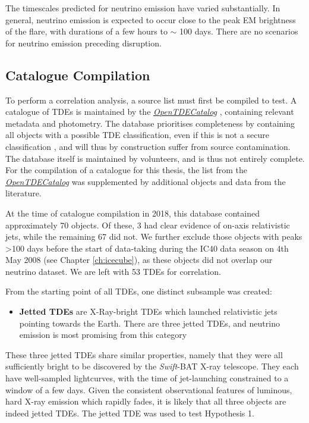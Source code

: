 The timescales predicted for neutrino emission have varied substantially. In general, neutrino emission is expected to occur close to the peak EM brightness of the flare, with durations of a few hours to $\sim$ 100 days. There are no scenarios for neutrino emission preceding disruption. 

\subsection{Catalogue Compilation}

To perform a correlation analysis, a source list must first be compiled to test. A catalogue of TDEs is maintained by the \emph{\href{https://tde.space/}{OpenTDECatalog}} , containing relevant metadata and photometry. The database prioritises completeness by containing all objects with a possible TDE classification, even if this is not a secure classification \cite{tde_catalog_paper}, and will thus by construction suffer from source contamination. The database itself is maintained by volunteers, and is thus not entirely complete. For the compilation of a catalogue for this thesis, the list from the \emph{\href{https://tde.space/}{OpenTDECatalog}} was supplemented by additional objects and data from the literature.

At the time of catalogue compilation in 2018, this database contained approximately 70 objects. Of these, 3 had clear evidence of on-axis relativistic jets, while the remaining 67 did not. We further exclude those objects with peaks >100 days before the start of data-taking during the IC40 data season on 4th May 2008 (see Chapter \ref{ch:icecube}), as these objects did not overlap our neutrino dataset. We are left with 53 TDEs for correlation.

From the starting point of all TDEs, one distinct subsample was created:

\begin{itemize}
	\item \textbf{Jetted TDEs} are X-Ray-bright TDEs which launched relativistic jets pointing towards the Earth. There are three jetted TDEs, and neutrino emission is most promising from this category
\end{itemize}

These three jetted TDEs share similar properties, namely that they were all sufficiently bright to be discovered by the \textit{Swift}-BAT X-ray telescope. They each have well-sampled lightcurves, with the time of jet-launching constrained to a window of a few days. Given the consistent observational features of luminous, hard X-ray emission which rapidly fades, it is likely that all three objects are indeed jetted TDEs. The jetted TDE was used to test Hypothesis 1.

